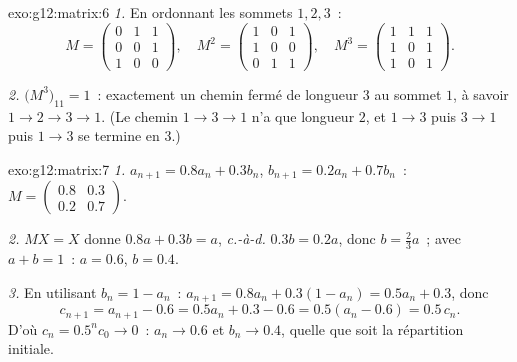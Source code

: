\begin{solution}{exo:g12:matrix:6}
\emph{1.} En ordonnant les sommets $1, 2, 3$~:
\[
M = \begin{pmatrix} 0&1&1\\ 0&0&1\\ 1&0&0\end{pmatrix}, \quad
M^2 = \begin{pmatrix} 1&0&1\\ 1&0&0\\ 0&1&1\end{pmatrix}, \quad
M^3 = \begin{pmatrix} 1&1&1\\ 1&0&1\\ 1&0&1 \end{pmatrix}.
\]

\emph{2.} $\bigl(M^3\bigr)_{11} = 1$~: exactement un chemin fermé de
longueur $3$ au sommet $1$, à savoir $1 \to 2 \to 3 \to 1$. (Le chemin
$1 \to 3 \to 1$ n'a que longueur $2$, et $1 \to 3$ puis $3\to1$ puis
$1\to3$ se termine en $3$.)
\end{solution}

\begin{solution}{exo:g12:matrix:7}
\emph{1.} $a_{n+1} = 0.8a_n + 0.3b_n$, $b_{n+1} = 0.2a_n + 0.7b_n$~:
$M = \begin{pmatrix} 0.8 & 0.3\\ 0.2 & 0.7\end{pmatrix}$.

\emph{2.} $MX = X$ donne $0.8a + 0.3b = a$, \emph{c.-à-d.} $0.3b = 0.2a$,
donc $b = \frac23 a$~; avec $a + b = 1$~: $a = 0.6$, $b = 0.4$.

\emph{3.} En utilisant $b_n = 1 - a_n$~:
$a_{n+1} = 0.8a_n + 0.3(1 - a_n) = 0.5a_n + 0.3$, donc
\[
c_{n+1} = a_{n+1} - 0.6 = 0.5a_n + 0.3 - 0.6 = 0.5(a_n - 0.6) = 0.5\,c_n .
\]
D'où $c_n = 0.5^n c_0 \to 0$~: $a_n \to 0.6$ et $b_n \to 0.4$, quelle que
soit la répartition initiale.
\end{solution}

